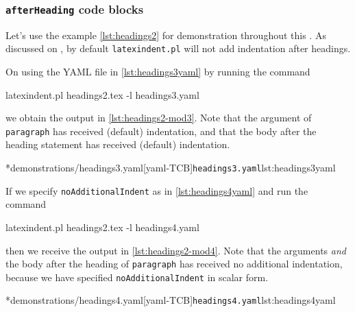 \subsubsection{\texttt{afterHeading} code blocks}\label{subsubsec-headings-no-add-indent-rules}
	Let's use the example \cref{lst:headings2} for demonstration throughout this .
	As discussed on , by default \texttt{latexindent.pl} will not add indentation after headings.


	On using the YAML file in \cref{lst:headings3yaml} by running the command \begin{commandshell}
latexindent.pl headings2.tex -l headings3.yaml      
    \end{commandshell} we obtain the output in \cref{lst:headings2-mod3}.
	Note that the argument of \texttt{paragraph} has received (default) indentation, and that the body after the heading statement has received (default) indentation.

	\begin{minipage}{.45\textwidth}
	\end{minipage}%
	\hfill
	\begin{minipage}{.45\textwidth}
		\cmhlistingsfromfile[style=yaml-LST]*{demonstrations/headings3.yaml}[yaml-TCB]{\texttt{headings3.yaml}}{lst:headings3yaml}
	\end{minipage}

	If we specify \texttt{noAdditionalIndent} as in \cref{lst:headings4yaml} and run the command \begin{commandshell}
latexindent.pl headings2.tex -l headings4.yaml      
    \end{commandshell} then we receive the output in \cref{lst:headings2-mod4}.
	Note that the arguments \emph{and} the body after the heading of \texttt{paragraph} has received no additional indentation, because we have specified \texttt{noAdditionalIndent} in scalar form.

	\begin{minipage}{.45\textwidth}
	\end{minipage}%
	\hfill
	\begin{minipage}{.45\textwidth}
		\cmhlistingsfromfile[style=yaml-LST]*{demonstrations/headings4.yaml}[yaml-TCB]{\texttt{headings4.yaml}}{lst:headings4yaml}
	\end{minipage}

